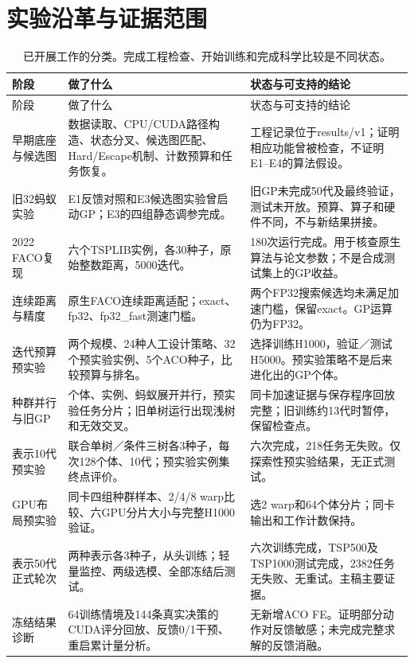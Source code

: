 \documentclass[runningheads,orivec]{llncs}
\begin{document}
\section{实验沿革与证据范围}
\begin{longtable}{@{}L{20mm}L{47mm}L{49mm}@{}}
\caption{已开展工作的分类。完成工程检查、开始训练和完成科学比较是不同状态。}\label{tab:catalog}\\
\toprule 阶段 & 做了什么 & 状态与可支持的结论\\ \midrule\endfirsthead
\toprule 阶段 & 做了什么 & 状态与可支持的结论\\ \midrule\endhead
早期底座与候选图 & 数据读取、CPU/CUDA路径构造、状态分叉、候选图匹配、Hard/Escape机制、计数预算和任务恢复。 & 工程记录位于results/v1；证明相应功能曾被检查，不证明E1--E4的算法假设。\\
旧32蚂蚁实验 & E1反馈对照和E3候选图实验曾启动GP；E3的四组静态调参完成。 & 旧GP未完成50代及最终验证，测试未开放。预算、算子和硬件不同，不与新结果拼接。\\
2022 FACO复现 & 六个TSPLIB实例，各30种子，原始整数距离，5000迭代。 & 180次运行完成。用于核查原生算法与论文参数；不是合成测试集上的GP收益。\\
连续距离与精度 & 原生FACO连续距离适配；exact、fp32、fp32\_fast测速门槛。 & 两个FP32搜索候选均未满足加速门槛，保留exact。GP运算仍为FP32。\\
迭代预算预实验 & 两个规模、24种人工设计策略、32个预实验实例、5个ACO种子，比较预算与排名。 & 选择训练H1000，验证／测试H5000。预实验策略不是后来进化出的GP个体。\\
种群并行与旧GP & 个体、实例、蚂蚁展开并行，预实验任务分片；旧单树运行出现浅树和无效交叉。 & 同卡加速证据与保存程序回放完整；旧训练约13代时暂停，保留检查点。\\
表示10代预实验 & 联合单树／条件三树各3种子，每次128个体、10代；预实验实例集终点评价。 & 六次完成，218任务无失败。仅探索性预实验结果，无正式测试。\\
GPU布局预实验 & 同卡四组种群样本、2/4/8 warp比较、六GPU分片大小与完整H1000验证。 & 选2 warp和64个体分片；同卡输出和工作计数保持。\\
表示50代正式轮次 & 两种表示各3种子，从头训练；轻量监控、两级选模、全部冻结后测试。 & 六次训练完成，TSP500及TSP1000测试完成，2382任务无失败、无重试。主稿主要证据。\\
冻结结果诊断 & 64训练情境及144条真实决策的CUDA评分回放、反馈0/1干预、重启累计量分析。 & 无新增ACO FE。证明部分动作对反馈敏感；未完成完整求解的反馈消融。\\
\bottomrule
\end{longtable}
\end{document}
